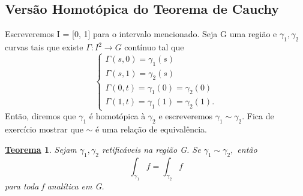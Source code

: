 \documentclass{article}
\newtheorem*{theorem*}{\underline{Teorema}}
\begin{document}
  \subsection{Vers\~ao Homot\'opica do Teorema de Cauchy}
  Escreveremos I = [0, 1] para o intervalo mencionado. Seja G uma regi\~ao e $\gamma_{1}, \gamma_{2}$ curvas tais que existe
  \(\Gamma:I^{2}\rightarrow G\) cont\'inuo tal que 
  $$
  \left\{\begin{array}{ll}
      \Gamma(s, 0) = \gamma_{1}(s)\\
      \Gamma(s, 1) = \gamma_{2}(s)\\
      \Gamma(0, t) = \gamma_{1}(0) = \gamma_{2}(0)\\
      \Gamma(1, t) = \gamma_{1}(1) = \gamma_{2}(1).
  \end{array}\right.
  $$
  Ent\~ao, diremos que $\gamma_{1}$ \'e homot\'opica \`a $\gamma_{2}$ e escreveremos $\gamma_{1}\sim\gamma_{2}.$ Fica de exerc\'icio
  mostrar que $\sim$ \'e uma rela\c c\~ao de equival\^encia.
  \begin{theorem*}
    Sejam $\gamma_{1}, \gamma_{2}$ retific\'aveis na regi\~ao G. Se $\gamma_{1}\sim \gamma_{2},$ ent\~ao
    $$
    \int_{\gamma_{1}}f = \int_{\gamma_{2}}f
    $$
    para toda f anal\'itica em G. 
  \end{theorem*}
\end{document}
